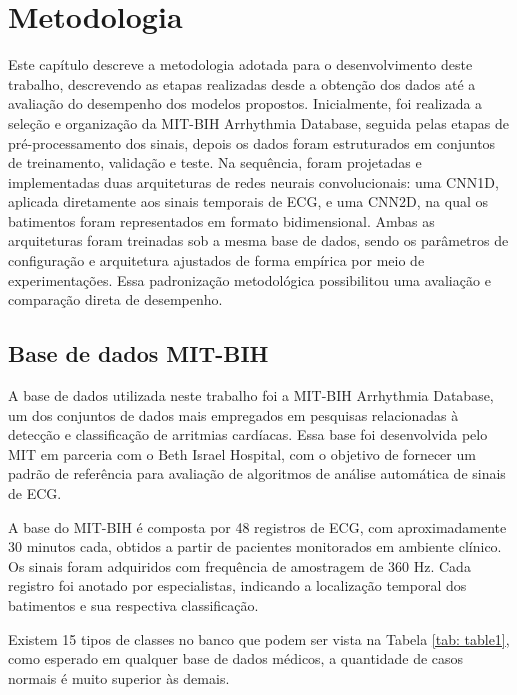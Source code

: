 \chapter[Metodologia]{Metodologia}

Este capítulo descreve a metodologia adotada para o desenvolvimento deste trabalho, descrevendo as etapas realizadas desde a obtenção dos dados 
até a avaliação do desempenho dos modelos propostos. Inicialmente, foi realizada a seleção e organização da MIT-BIH Arrhythmia 
Database, seguida pelas etapas de pré-processamento dos sinais, depois os dados foram estruturados em conjuntos de treinamento, validação e 
teste. Na sequência, foram projetadas e implementadas duas arquiteturas de redes neurais convolucionais: uma CNN1D, aplicada diretamente aos 
sinais temporais de ECG, e uma CNN2D, na qual os batimentos foram representados em formato bidimensional. Ambas as arquiteturas foram treinadas sob a 
mesma base de dados, sendo os parâmetros de configuração e arquitetura ajustados de forma empírica por meio de experimentações. Essa padronização 
metodológica possibilitou uma avaliação e comparação direta de desempenho.

\section{Base de dados MIT-BIH}

A base de dados utilizada neste trabalho foi a MIT-BIH Arrhythmia Database, um dos conjuntos de dados mais empregados em 
pesquisas relacionadas à detecção e classificação de arritmias cardíacas. Essa base foi desenvolvida pelo MIT em parceria com o Beth Israel 
Hospital, com o objetivo de fornecer um padrão de referência para avaliação de algoritmos de análise 
automática de sinais de ECG.

A base do MIT-BIH é composta por 48 registros de ECG, com aproximadamente 30 minutos cada, obtidos a partir de pacientes 
monitorados em ambiente clínico. Os sinais foram adquiridos com frequência de amostragem de 360 Hz. Cada registro foi anotado 
por especialistas, indicando a localização temporal dos batimentos e sua respectiva classificação.

Existem 15 tipos de classes no banco que podem ser vista na Tabela \ref{tab: table1}, como esperado em qualquer base de dados médicos, a quantidade de casos 
normais é muito superior às demais.

